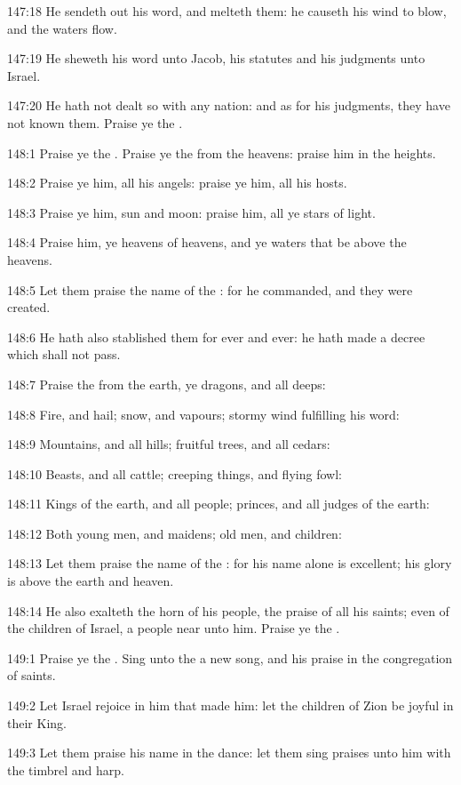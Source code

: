 147:18 He sendeth out his word, and melteth them: he causeth his wind
to blow, and the waters flow.

147:19 He sheweth his word unto Jacob, his statutes and his judgments
unto Israel.

147:20 He hath not dealt so with any nation: and as for his judgments,
they have not known them. Praise ye the \LORD.



148:1 Praise ye the \LORD. Praise ye the \LORD from the heavens: praise
him in the heights.

148:2 Praise ye him, all his angels: praise ye him, all his hosts.

148:3 Praise ye him, sun and moon: praise him, all ye stars of light.

148:4 Praise him, ye heavens of heavens, and ye waters that be above
the heavens.

148:5 Let them praise the name of the \LORD: for he commanded, and they
were created.

148:6 He hath also stablished them for ever and ever: he hath made a
decree which shall not pass.

148:7 Praise the \LORD from the earth, ye dragons, and all deeps:

148:8 Fire, and hail; snow, and vapours; stormy wind fulfilling his
word:

148:9 Mountains, and all hills; fruitful trees, and all cedars:

148:10 Beasts, and all cattle; creeping things, and flying fowl:

148:11 Kings of the earth, and all people; princes, and all judges of
the earth:

148:12 Both young men, and maidens; old men, and children:

148:13 Let them praise the name of the \LORD: for his name alone is
excellent; his glory is above the earth and heaven.

148:14 He also exalteth the horn of his people, the praise of all his
saints; even of the children of Israel, a people near unto him. Praise
ye the \LORD.



149:1 Praise ye the \LORD. Sing unto the \LORD a new song, and his
praise in the congregation of saints.

149:2 Let Israel rejoice in him that made him: let the children of
Zion be joyful in their King.

149:3 Let them praise his name in the dance: let them sing praises
unto him with the timbrel and harp.

